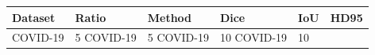 \begin{tabular}{llllll}
\toprule
Dataset & Ratio & Method & Dice & IoU & HD95 \\
\midrule
COVID-19 & 5%
COVID-19 & 5%
COVID-19 & 10%
COVID-19 & 10%
\bottomrule
\end{tabular}
